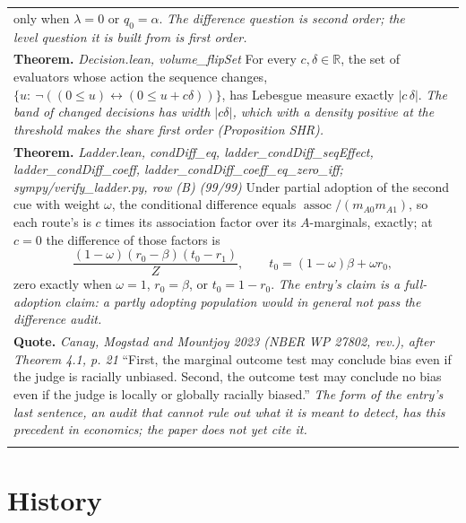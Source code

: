 \documentclass[10pt]{article}
\theoremstyle{definition}
\newcommand{\assoc}{\operatorname{assoc}}
\newlength{\fullw}\setlength{\fullw}{25.9cm}
\begin{document}
{\begin{longtable}{|p{0.9cm}|p{12.2cm}|p{12.2cm}|}
{only when $\lambda=0$ or $q_0=\alpha$. \newline \textit{The difference question is second order; the level question it is built from is first order.}} \\
\multicolumn{3}{|p{\fullw}|}{\textbf{Theorem.} \textit{Decision.lean, volume\_flipSet} \newline For every $c,\delta\in\mathbb R$, the set of evaluators whose action the sequence
changes, $\{u:\ \neg((0\le u)\leftrightarrow(0\le u+c\delta))\}$, has Lebesgue measure
exactly $|c\,\delta|$. \newline \textit{The band of changed decisions has width $|c\delta|$, which with a density positive at the threshold makes the share first order (Proposition SHR).}} \\
\multicolumn{3}{|p{\fullw}|}{\textbf{Theorem.} \textit{Ladder.lean, condDiff\_eq, ladder\_condDiff\_seqEffect, ladder\_condDiff\_coeff, ladder\_condDiff\_coeff\_eq\_zero\_iff; sympy/verify\_ladder.py, row (B) (99/99)} \newline Under partial adoption of the second cue with weight $\omega$, the conditional
difference equals $\assoc/(m_{A0}m_{A1})$, so each route's is $c$ times its association factor
over its $A$-marginals, exactly; at $c=0$ the difference of those factors is
\[
\frac{(1-\omega)(r_0-\beta)(t_0-r_1)}{Z},\qquad t_0=(1-\omega)\beta+\omega r_0,
\]
zero exactly when $\omega=1$, $r_0=\beta$, or $t_0=1-r_0$. \newline \textit{The entry's claim is a full-adoption claim: a partly adopting population would in general not pass the difference audit.}} \\
\multicolumn{3}{|p{\fullw}|}{\textbf{Quote.} \textit{Canay, Mogstad and Mountjoy 2023 (NBER WP 27802, rev.), after Theorem 4.1, p. 21} \newline ``First, the marginal outcome test may conclude bias even if the judge is racially
unbiased. Second, the outcome test may conclude no bias even if the judge is locally
or globally racially biased.'' \newline \textit{The form of the entry's last sentence, an audit that cannot rule out what it is meant to detect, has this precedent in economics; the paper does not yet cite it.}} \\ \hline
\multicolumn{3}{|l|}{} \\ \hline
\end{longtable}
}

\section*{History}
\end{document}
